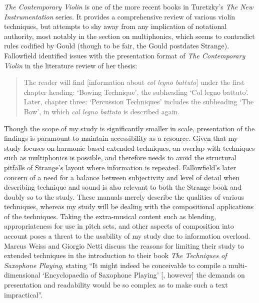\emph{The Contemporary Violin} is one of the more recent books in Turetzky’s \emph{The New Instrumentation} series.\autocite[]{strangeContemporaryViolinExtended2001} 
It provides a comprehensive review of various violin techniques, but attempts to shy away from any implication of notational authority, most notably in the section on multiphonics, which seems to contradict rules codified by Gould (though to be fair, the Gould postdates Strange).\autocites[134]{strangeContemporaryViolinExtended2001}[257--258]{gouldBars2011} 
Fallowfield identified issues with the presentation format of \emph{The Contemporary Violin} in the literature review of her thesis: 
\begin{quotation}
 The reader will find [information about \textit{col legno battuto}] under the first chapter heading: ‘Bowing Technique’, the subheading ‘Col legno battuto’. Later, chapter three: ‘Percussion Techniques’ includes the subheading ‘The Bow’, in which \textit{col legno battuto} is described again.\autocite[12]{fallowfieldCelloMapHandbook2009}
\end{quotation}
Though the scope of my study is significantly smaller in scale, presentation of the findings is paramount to maintain accessibility as a resource. 
Given that my study focuses on harmonic based extended techniques, an overlap with techniques such as multiphonics is possible, and therefore needs to avoid the structural pitfalls of Strange’s layout where information is repeated. 
Fallowfield’s later concern of a need for a balance between subjectivity and level of detail when describing technique and sound is also relevant to both the Strange book and doubly so to the study. 
These manuals merely describe the qualities of various techniques, whereas my study will be dealing with the compositional applications of the techniques. 
Taking the extra-musical content such as blending, appropriateness for use in pitch sets, and other aspects of composition into account poses a threat to the usability of my study due to information overload. 
Marcus Weiss and Giorgio Netti discuss the reasons for limiting their study to extended techniques in the introduction to their book \emph{The Techniques of Saxophone Playing}, stating ``It might indeed be conceivable to compile a multi-dimensional `Encyclopaedia of Saxophone Playing' [, however] the demands on presentation and readability would be so complex as to make such a text impractical''.\autocite[Introduction]{weissTechniquesSaxophonePlaying2010}

